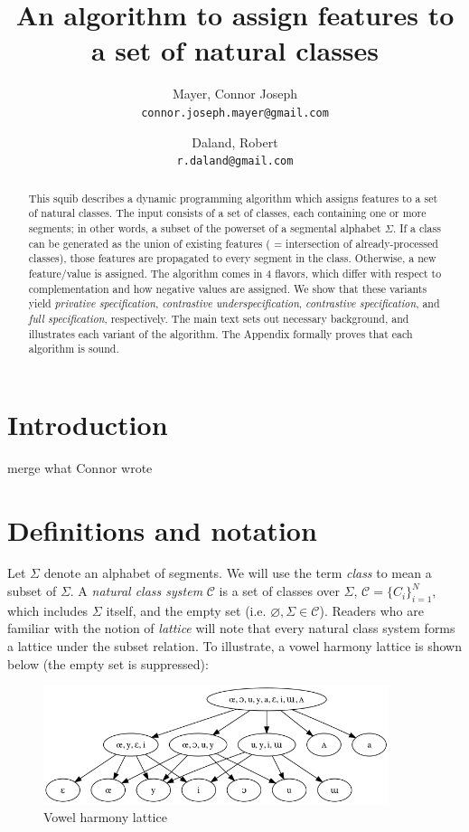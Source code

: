 \documentclass[11pt, oneside]{article}   	%
\title{An algorithm to assign features to a set of natural classes}
\author{}
\author{
  Mayer, Connor Joseph \\
  \texttt{connor.joseph.mayer@gmail.com}
  \and
  Daland, Robert \\
  \texttt{r.daland@gmail.com}
}
\begin{document}
\maketitle

\begin{abstract}
This squib describes a dynamic programming algorithm which assigns features to a set of natural classes. The input consists of a set of classes, each containing one or more segments; in other words, a subset of the powerset of a segmental alphabet $\Sigma$. If a class can be generated as the union of existing features ( = intersection of already-processed classes), those features are propagated to every segment in the class. Otherwise, a new feature/value is assigned. The algorithm comes in 4 flavors, which differ with respect to complementation and how negative values are assigned. We show that these variants yield \textit{privative specification}, \textit{contrastive underspecification}, \textit{contrastive specification}, and \textit{full specification}, respectively. The main text sets out necessary background, and illustrates each variant of the algorithm. The Appendix formally proves that each algorithm is sound.
\end{abstract}

\section{Introduction}
merge what Connor wrote

\section{Definitions and notation}

Let $\Sigma$ denote an alphabet of segments. We will use the term \textit{class} to mean a subset of $\Sigma$.  A \textit{natural class system} $\mathcal C$ is a set of classes over $\Sigma$, $\mathcal C = \{C_i\}_{i=1}^N$, which includes $\Sigma$ itself, and the empty set (i.e. $\varnothing , \Sigma \in \mathcal C$). Readers who are familiar with the notion of \textit{lattice} will note that every natural class system forms a lattice under the subset relation. To illustrate, a vowel harmony lattice is shown below (the empty set is suppressed):

\begin{figure}[h]
\includegraphics[width=0.9\textwidth]{vowelHarmony_unicode.png}
\caption{Vowel harmony lattice}
\label{fig:lattice}
\end{figure}
\end{document}
